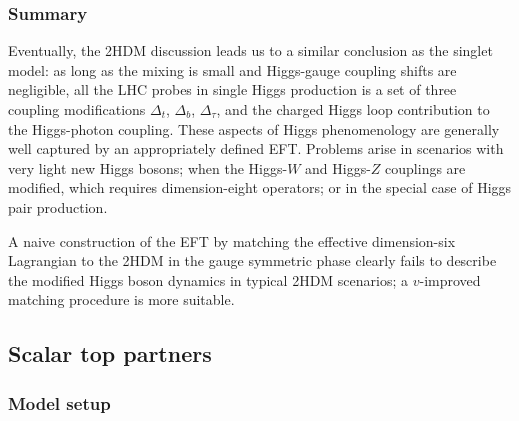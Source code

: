 \subsubsection{Summary}

Eventually, the 2HDM discussion leads us to a similar conclusion as
the singlet model: as long as the mixing is small and Higgs-gauge
coupling shifts are negligible, all the LHC probes in single Higgs
production is a set of three coupling modifications $\Delta_t$,
$\Delta_b$, $\Delta_\tau$, and the charged Higgs loop contribution to
the Higgs-photon coupling. These aspects of Higgs phenomenology are
generally well captured by an appropriately defined EFT. Problems
arise in scenarios with very light new Higgs bosons; when the
Higgs-$W$ and Higgs-$Z$ couplings are modified, which requires
dimension-eight operators; or in the special case of Higgs pair
production.

A naive construction of the EFT by matching the effective
dimension-six Lagrangian to the 2HDM in the gauge symmetric phase
clearly fails to describe the modified Higgs boson dynamics in typical
2HDM scenarios; a $v$-improved matching procedure is more suitable.



\subsection{Scalar top partners}
\label{sec:validity_stops}

\subsubsection{Model setup}

